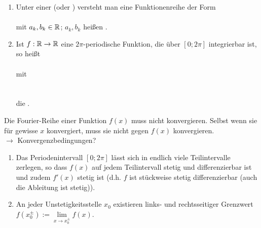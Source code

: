 \Def
\begin{enumerate}
	\item Unter einer  (oder ) versteht man eine Funktionenreihe der Form\\
	\hhspace{2cm}\\
	mit $a_k,b_k\in\mathbb{R}$; $a_k,b_k$ heißen .
	
	\item Ist $f:\mathbb{R}\to\mathbb{R}$ eine $2\pi$-periodische Funktion, die über ${[0;2\pi]}$ integrierbar ist, so heißt\\
	\hhspace{2cm}\\
	mit\\
	\hhspace{2cm}\\
	\hhspace{2cm}\\
	die .
\end{enumerate}

\Bem Die Fourier-Reihe einer Funktion $f(x)$ muss nicht konvergieren. Selbst wenn sie für gewisse $x$ konvergiert, muss sie nicht gegen $f(x)$ konvergieren.\\
$\rightarrow$ Konvergenzbedingungen?

\begin{enumerate}
	\item Das Periodenintervall ${[0;2\pi]}$ lässt sich in endlich viele Teilintervalle zerlegen, so dass $f(x)$ auf jedem Teilintervall stetig und differenzierbar ist und zudem $f'(x)$ stetig ist (d.h. $f$ ist stückweise stetig differenzierbar (auch die Ableitung ist stetig)).
	
	\item An jeder Unstetigkeitsstelle $x_0$ existieren links- und rechtsseitiger Grenzwert $f(x_0^\pm):=\lim\limits_{x\to x_0^\pm}f(x)$.\qquad{}\qquad
\end{enumerate}

